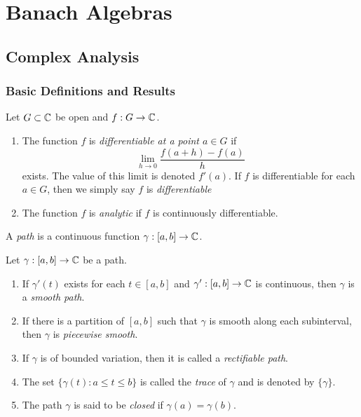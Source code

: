 \chapter{Banach Algebras}

\section{Complex Analysis}

\subsection{Basic Definitions and Results}

\begin{definition}
	Let $G \subset \mathbb{C}$ be open and $f:G \rightarrow \mathbb{C}$.
	\mbox{}
	\begin{enumerate}[label = (\arabic*),itemsep=1pt,topsep=3pt]
		\item The function $f$ is \emph{differentiable at a point $a \in G$} if
			\[
				\lim_{h \rightarrow 0}\frac{f(a+h) - f(a)}{h}
			\] 
			exists. The value of this limit is denoted $f'(a)$. If $f$ is differentiable for each $a \in G$, then we simply say $f$ is \emph{differentiable}
		\item The function $f$ is \emph{analytic} if $f$ is continuously differentiable.
	\end{enumerate}
\end{definition}

\begin{definition}
	A \emph{path} is a continuous function $\gamma:[a,b] \rightarrow \mathbb{C}$.
\end{definition}

\begin{definition}
	Let $\gamma:[a,b] \rightarrow \mathbb{C}$ be a path.
	\mbox{}
	\begin{enumerate}[label = (\arabic*),itemsep=1pt,topsep=3pt]
		\item If $\gamma'(t)$ exists for each $t \in [a,b]$ and $\gamma':[a,b] \rightarrow \mathbb{C}$ is continuous, then $\gamma$ is a \emph{smooth path}.
		\item If there is a partition of $[a,b]$ such that $\gamma$ is smooth along each subinterval, then $\gamma$ is \emph{piecewise smooth}.
		\item If $\gamma$ is of bounded variation, then it is called a \emph{rectifiable path}.
		\item The set $\{\gamma(t):a \leq t \leq b\}$ is called the \emph{trace} of $\gamma$ and is denoted by $\{\gamma\}$.
		\item The path $\gamma$ is said to be \emph{closed} if $\gamma(a) = \gamma(b)$.
	\end{enumerate}
\end{definition}

